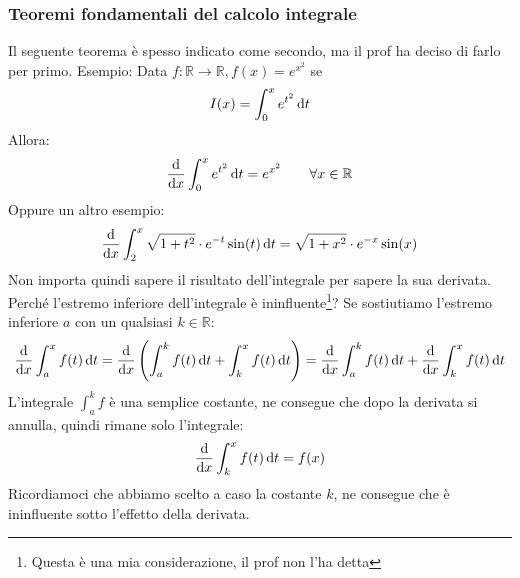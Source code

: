 \subsubsection{Teoremi fondamentali del calcolo integrale}
Il seguente teorema è spesso indicato come secondo, ma il prof ha deciso di farlo per primo.
\thm{
	Sia $f:]a,b[ \to \mathbb{R}$ continua e sia $c\in ]a,b[$. Allora vale:
	\begin{equation*}
		I_c'(x) = f(x) \qquad \forall x \in ]a,b[
	\end{equation*}
	Cioè:
	\begin{equation*}
		\dv{}{x} \int_c^x f(t) \diff t = f(x) \qquad \forall x \in ]a,b[
	\end{equation*}
}
Esempio: Data $f:\mathbb{R} \to \mathbb{R}, f(x) = e^{x^2}$ se 
\begin{equation*}
	I(x) = \int_0^x e^{t^2} \,\text{d} t
\end{equation*}
Allora:
\begin{equation*}
	\dv{}{x} \int_0^x e^{t^2} \,\text{d} t = e^{x^2} \qquad \forall x \in \mathbb{R}
\end{equation*}
Oppure un altro esempio:
\begin{equation*}
	\dv{}{x} \int_2^x \sqrt{1+t^2} \cdot e^{-t} \sin(t) \,\text{d} t = \sqrt{1+x^2} \cdot e^{-x} \sin(x)
\end{equation*}
Non importa quindi sapere il risultato dell'integrale per sapere la sua derivata.\\

Perché l'estremo inferiore dell'integrale è ininfluente\footnote{Questa è una mia considerazione, il prof non l'ha detta}? Se sostiutiamo l'estremo inferiore $a$ con un qualsiasi $k \in \mathbb{R}$:
\begin{equation*}
	\dv{}{x} \int_a^x f(t) \,\text{d} t = \dv{}{x} \left(\int_a^k f(t) \,\text{d} t + \int_k^x f(t) \,\text{d} t\right) = \dv{}{x} \int_a^k f(t) \,\text{d} t + \dv{}{x} \int_k^x f(t) \,\text{d} t
\end{equation*}
L'integrale $\int_a^k f$ è una semplice costante, ne consegue che dopo la derivata si annulla, quindi rimane solo l'integrale:
\begin{equation*}
	\dv{}{x} \int_k^x f(t) \,\text{d} t = f(x)
\end{equation*}
Ricordiamoci che abbiamo scelto a caso la costante $k$, ne consegue che è ininfluente sotto l'effetto della derivata.

